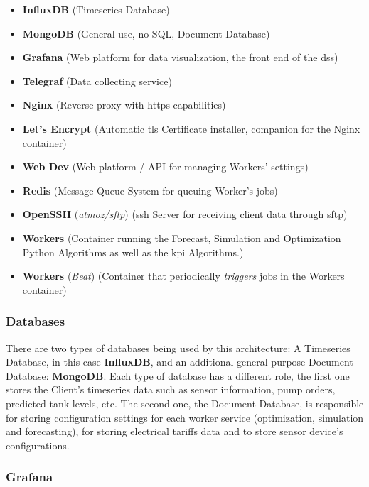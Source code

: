\begin{itemize}

\item \textbf{InfluxDB} (Timeseries Database)
\item \textbf{MongoDB} (General use, no-SQL, Document Database)
\item \textbf{Grafana} (Web platform for data visualization, the front end of the \gls{dss})
\item \textbf{Telegraf} (Data collecting service)
\item \textbf{Nginx} (Reverse proxy with \gls{https} capabilities)
\item \textbf{Let's Encrypt} (Automatic \gls{tls} Certificate installer, companion for the Nginx container)
\item \textbf{Web Dev} (Web platform / API for managing Workers' settings)
\item \textbf{Redis} (Message Queue System for queuing Worker's jobs)
\item \textbf{OpenSSH} (\textit{atmoz/sftp}) (\gls{ssh} Server for receiving client data through \gls{sftp})
\item \textbf{Workers} (Container running the Forecast, Simulation and Optimization Python Algorithms as well as the \gls{kpi} Algorithms.)
\item \textbf{Workers} (\textit{Beat}) (Container that periodically \textit{triggers} jobs in the Workers container)

\end{itemize}




\subsubsection{Databases}\label{methodology:sss:databases}

There are two types of databases being used by this architecture: A Timeseries Database, in this case \textbf{InfluxDB}, and an additional general-purpose Document Database: \textbf{MongoDB}. Each type of database has a different role, the first one stores the Client's timeseries data such as sensor information, pump orders, predicted tank levels, etc.
The second one, the Document Database, is responsible for storing configuration settings for each worker service (optimization, simulation and forecasting), for storing electrical tariffs data and to store sensor device's configurations.

\subsubsection{Grafana}\label{methodology:sss:grafana}

